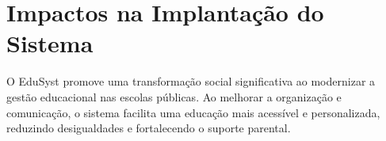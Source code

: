 \documentclass[main.tex]{subfiles}
\begin{document}



\section{Impactos na Implantação do Sistema}
O EduSyst promove uma transformação social significativa ao modernizar a gestão educacional nas escolas públicas. Ao melhorar a organização e comunicação, o sistema facilita uma educação mais acessível e personalizada, reduzindo desigualdades e fortalecendo o suporte parental.

\end{document}
